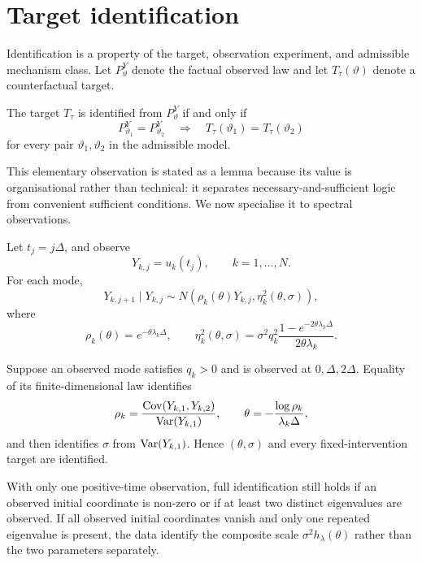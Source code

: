 \section{Target identification}\label{sec:identification}

Identification is a property of the target, observation experiment, and admissible mechanism class. Let $P_\vartheta^Y$ denote the factual observed law and let $T_\tau(\vartheta)$ denote a counterfactual target.

\begin{lemma}\label{thm:fibre}
The target $T_\tau$ is identified from $P_\vartheta^Y$ if and only if
\[
 P_{\vartheta_1}^Y=P_{\vartheta_2}^Y
 \quad\Longrightarrow\quad
 T_\tau(\vartheta_1)=T_\tau(\vartheta_2)
\]
for every pair $\vartheta_1,\vartheta_2$ in the admissible model.
\end{lemma}

This elementary observation is stated as a lemma because its value is organisational rather than technical: it separates necessary-and-sufficient logic from convenient sufficient conditions. We now specialise it to spectral observations.

Let $t_j=j\Delta$, and observe
\[
 Y_{k,j}=u_k(t_j),
 \qquad k=1,\ldots,N.
\]
For each mode,
\begin{equation}\label{eq:transition}
 Y_{k,j+1}\mid Y_{k,j}
 \sim N\left(\rho_k(\theta)Y_{k,j},\eta_k^2(\theta,\sigma)\right),
\end{equation}
where
\[
 \rho_k(\theta)=e^{-\theta\lambda_k\Delta},
 \qquad
 \eta_k^2(\theta,\sigma)
 =\sigma^2q_k^2\frac{1-e^{-2\theta\lambda_k\Delta}}{2\theta\lambda_k}.
\]

\begin{theorem}\label{thm:exact-id}
Suppose an observed mode satisfies $q_k>0$ and is observed at $0,\Delta,2\Delta$. Equality of its finite-dimensional law identifies
\[
 \rho_k
 =\frac{\operatorname{Cov}(Y_{k,1},Y_{k,2})}{\operatorname{Var}(Y_{k,1})},
 \qquad
 \theta=-\frac{\log\rho_k}{\lambda_k\Delta},
\]
and then identifies $\sigma$ from $\operatorname{Var}(Y_{k,1})$. Hence $(\theta,\sigma)$ and every fixed-intervention target are identified.
\end{theorem}

With only one positive-time observation, full identification still holds if an observed initial coordinate is non-zero or if at least two distinct eigenvalues are observed. If all observed initial coordinates vanish and only one repeated eigenvalue is present, the data identify the composite scale $\sigma^2h_\lambda(\theta)$ rather than the two parameters separately.

